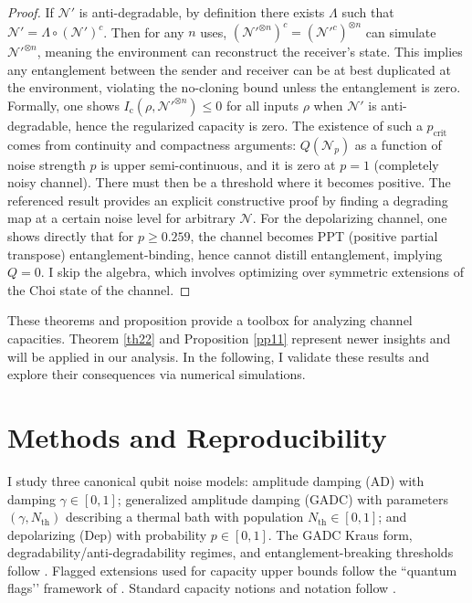 \documentclass[11pt]{article}
\theoremstyle{plain}
\theoremstyle{definition}
\numberwithin{equation}{section}
\begin{document}
\begin{proof}
    If $\mathcal{N}'$ is anti-degradable, by definition there exists $\Lambda$ such that $\mathcal{N}' = \Lambda \circ (\mathcal{N}')^c$. Then for any $n$ uses, $(\mathcal{N}'^{\otimes n})^c = (\mathcal{N}'^c)^{\otimes n}$ can simulate $\mathcal{N}'^{\otimes n}$, meaning the environment can reconstruct the receiver’s state. This implies any entanglement between the sender and receiver can be at best duplicated at the environment, violating the no-cloning bound unless the entanglement is zero. Formally, one shows $I_{\mathrm{c}}(\rho,\mathcal{N}'^{\otimes n}) \le 0$ for all inputs $\rho$ when $\mathcal{N}'$ is anti-degradable, hence the regularized capacity is zero. The existence of such a $p_{\text{crit}}$ comes from continuity and compactness arguments: $Q(\mathcal{N}_p)$ as a function of noise strength $p$ is upper semi-continuous, and it is zero at $p=1$ (completely noisy channel). There must then be a threshold where it becomes positive. The referenced result \cite{11} provides an explicit constructive proof by finding a degrading map at a certain noise level for arbitrary $\mathcal{N}$. For the depolarizing channel, one shows directly that for $p \ge 0.259$, the channel becomes PPT (positive partial transpose) entanglement-binding, hence cannot distill entanglement, implying $Q=0$. I skip the algebra, which involves optimizing over symmetric extensions of the Choi state of the channel.
\end{proof}


These theorems and proposition provide a toolbox for analyzing channel capacities. Theorem \ref{th22} and Proposition \ref{pp11} represent newer insights and will be applied in our analysis. In the following, I validate these results and explore their consequences via numerical simulations.

\section{Methods and Reproducibility}
\label{sec:methods}

I study three canonical qubit noise models: amplitude damping (AD) with damping $\gamma\in[0,1]$; generalized amplitude damping (GADC) with parameters $(\gamma,N_{\mathrm{th}})$ describing a thermal bath with population $N_{\mathrm{th}}\in[0,1]$; and depolarizing (Dep) with probability $p\in[0,1]$. The GADC Kraus form, degradability/anti-degradability regimes, and entanglement-breaking thresholds follow \cite{Khatri20}. Flagged extensions used for capacity upper bounds follow the “quantum flags’’ framework of \cite{FKG20,22}. Standard capacity notions and notation follow \cite{Wilde2017QIT,55}. %
\end{document}
